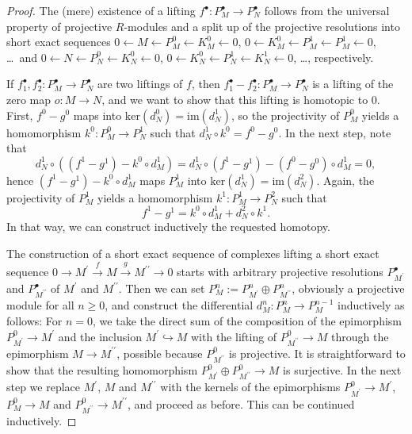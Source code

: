 \documentclass{amsart}
\theoremstyle{plain}
\numberwithin{equation}{section} %
\numberwithin{figure}{section} %
\theoremstyle{plain}
\theoremstyle{plain}
\theoremstyle{plain}
\theoremstyle{plain}
\theoremstyle{plain}
\theoremstyle{plain}
\theoremstyle{remark}
\theoremstyle{remark}
\theoremstyle{remark}
\begin{document}
\begin{proof}
The (mere) existence of a lifting $f^\bullet: P^\bullet_M \rightarrow P^\bullet_N$ follows from the universal property of projective $R$-modules and a split up of the projective resolutions into short exact sequences $0 \leftarrow M \leftarrow P^0_M \leftarrow K^0_M \leftarrow 0$, $0 \leftarrow K^0_M \leftarrow P^1_M \leftarrow P^1_M \leftarrow 0$, \ldots\ and $0 \leftarrow N \leftarrow P^0_N \leftarrow K^0_N \leftarrow 0$, $0 \leftarrow K^0_N \leftarrow P^1_N \leftarrow K^1_N \leftarrow 0$, \ldots, respectively.

If $f_1^\bullet, f_2^\bullet: P_M^\bullet \rightarrow P_N^\bullet$ are two liftings of $f$, then $f_1^\bullet - f_2^\bullet: P_M^\bullet \rightarrow P_N^\bullet$ is a lifting of the zero map $o: M \rightarrow N$, and we want to show that this lifting is homotopic to $0$. First, $f^0-g^0$ maps into $\mathrm{ker}(d_N^0) = \mathrm{im}(d_N^1)$, so the projectivity of $P_M^0$ yields a homomorphism $k^0 : P_M^0 \rightarrow P_N^1$ such that $d_N^1 \circ k^0 = f^0-g^0$. In the next step, note that
\[ d_N^1 \circ ((f^1 - g^1) - k^0 \circ d_M^1) = d_N^1 \circ (f^1 - g^1) - (f^0-g^0) \circ d_M^1 = 0, \]
hence $(f^1 - g^1) - k^0 \circ d_M^1$ maps $P_M^1$ into $\mathrm{ker}(d_N^1) = \mathrm{im}(d_N^2)$. Again, the projectivity of $P_M^1$ yields a homomorphism $k^1 : P_M^1 \rightarrow P_N^2$ such that
\[ f^1 - g^1 = k^0 \circ d_M^1 + d_N^2 \circ k^1. \]
In that way, we can construct inductively the requested homotopy.

The construction of a short exact sequence of complexes lifting a short exact sequence $0 \rightarrow M^\prime \stackrel{f}{\rightarrow} M \stackrel{g}{\rightarrow} M^{\prime\prime} \rightarrow 0$ starts with arbitrary projective resolutions $P_{M^\prime}^\bullet$ and $P_{M^{\prime\prime}}^\bullet$ of $M^\prime$ and $M^{\prime\prime}$. Then we can set $P_M^n := P_{M^\prime}^n \oplus P_{M^{\prime\prime}}^n$, obviously a projective module for all $n \geq 0$, and construct the differential $d^n_M : P_M^n \rightarrow P_M^{n-1}$ inductively as follows: For $n = 0$, we take the direct sum of the composition of the epimorphism $P_{M^\prime}^0 \rightarrow M^\prime$ and the inclusion $M^\prime \hookrightarrow M$ with the lifting of $P_{M^{\prime\prime}}^0 \rightarrow M$ through the epimorphism $M \rightarrow M^{\prime\prime}$, possible because $P_{M^{\prime\prime}}^0$ is projective. It is straightforward to show that the resulting homomorphism $P_{M^\prime}^0 \oplus P_{M^{\prime\prime}}^0 \rightarrow M$ is surjective. In the next step we replace $M^\prime$, $M$ and $M^{\prime\prime}$ with the kernels of the epimorphisms $P_{M^\prime}^0 \rightarrow M^\prime$,  $P_M^0 \rightarrow M$ and $P_{M^{\prime\prime}}^0 \rightarrow M^{\prime\prime}$, and proceed as before. This can be continued inductively.  
\end{proof}
\end{document}
